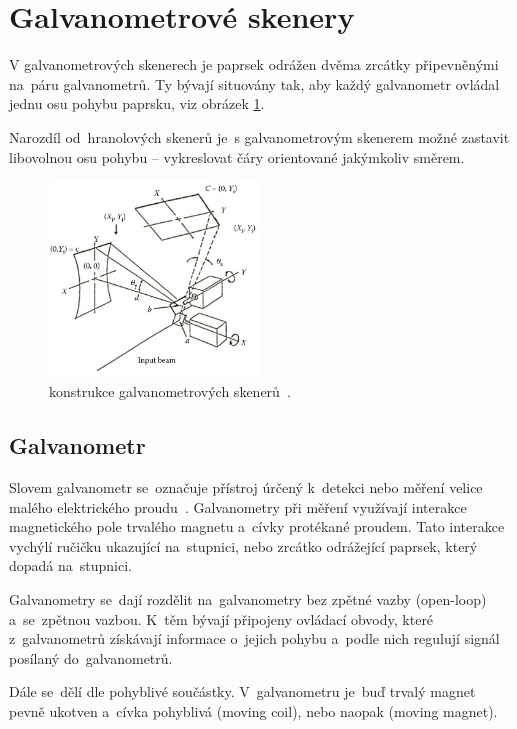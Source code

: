 \section{Galvanometrové skenery}
V galvanometrových skenerech je paprsek odrážen dvěma zrcátky připevněnými na~páru galvanometrů. Ty bývají situovány tak, aby každý galvanometr ovládal jednu osu pohybu paprsku, viz obrázek \ref{fig:scanner-constructions}.

Narozdíl od~hranolových skenerů je~s galvanometrovým skenerem možné zastavit libovolnou osu pohybu -- vykreslovat čáry orientované jakýmkoliv směrem.

\begin{figure}[htb]
  \centering
  \includegraphics[width=0.5\textwidth]{img/scanner-constructions.jpg}
  \caption{\label{fig:scanner-constructions} konstrukce galvanometrových skenerů~\cite{scanning-handbook}.}
\end{figure}

\subsection{Galvanometr}
Slovem galvanometr se~označuje přístroj úrčený k~detekci nebo měření velice malého elektrického proudu~\cite{galvo-definition}. Galvanometry při měření využívají interakce magnetického pole trvalého magnetu a~cívky protékané proudem. Tato interakce vychýlí ručičku ukazující na~stupnici, nebo zrcátko odrážející paprsek, který dopadá na~stupnici.~\cite{wiki-galvo}

Galvanometry se~dají rozdělit na~galvanometry bez zpětné vazby (open-loop) a~se~zpětnou vazbou. K~těm bývají připojeny ovládací obvody, které z~galvanometrů získávají informace o~jejich pohybu a~podle nich regulují signál posílaný do~galvanometrů.~\cite{wiki-galvo}

Dále se~dělí dle pohyblivé součástky. V~galvanometru je~buď trvalý magnet pevně ukotven a~cívka pohyblivá (moving coil), nebo naopak (moving magnet). %

